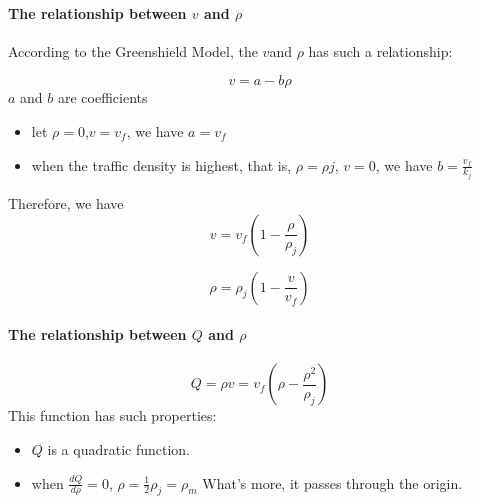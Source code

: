 \paragraph{The relationship between $v$ and $\rho$ }
According to the Greenshield Model, the $v $and $\rho$ has such a 
relationship:

\begin{equation}
v = a - b\rho
\end{equation}
$a$ and $b$ are coefficients

\begin{itemize}
\item let $\rho = 0$,$v = v_f$,
we have $a = v_f$
\\
\item when the traffic density is highest, that is,
$\rho = \rho j$, $v = 0$,
we have $b = \frac{v_f}{k_j}$
\end{itemize}

Therefore, we have 
\begin{equation}
v = v_f(1 - \frac{\rho}{\rho_j})
\end{equation}

\begin{equation}
\rho = \rho_j(1 - \frac{v}{v_f})
\end {equation}

\paragraph{The relationship between $Q$ and $\rho$ }
\begin{equation}
Q = \rho v = v_f(\rho - \frac{\rho^2}{\rho_j})
\end{equation}
This function has such properties:

\begin{itemize}
\item $Q$ is a quadratic function. 
\item when $\frac{dQ}{d \rho} = 0$, 
$\rho = \frac{1}{2}\rho_j = \rho_m $
What's more, it passes through the origin.
\end{itemize}




